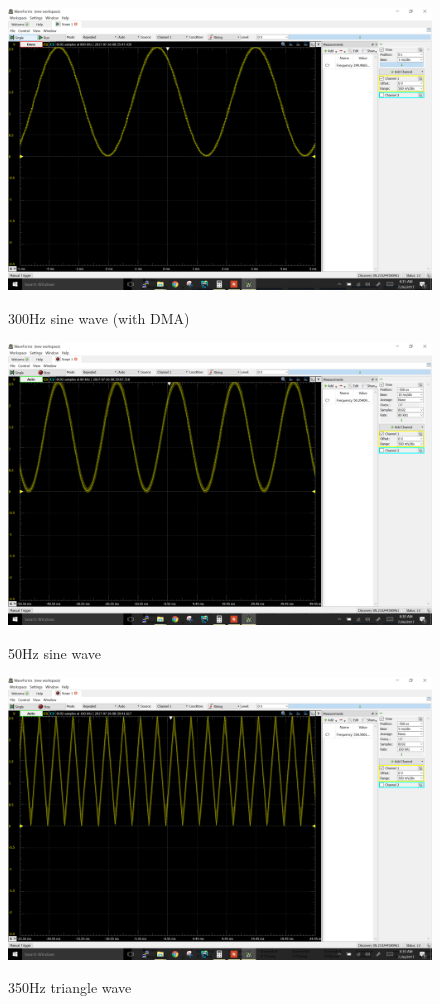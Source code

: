 \documentclass[11pt]{article}
\theoremstyle{plain}
\theoremstyle{definition}
\begin{document}
\begin{figure}[H]
	\centering
	\includegraphics[width=\textwidth]{C}
	\label{fig:c}
	\caption{300Hz sine wave (with DMA)}
\end{figure}
\begin{figure}[H]
	\centering
	\includegraphics[width=\textwidth]{D1}
	\label{fig:c}
	\caption{50Hz sine wave}
\end{figure}
\begin{figure}[H]
	\centering
	\includegraphics[width=\textwidth]{D2}
	\label{fig:c}
	\caption{350Hz triangle wave}
\end{figure}
\end{document}
